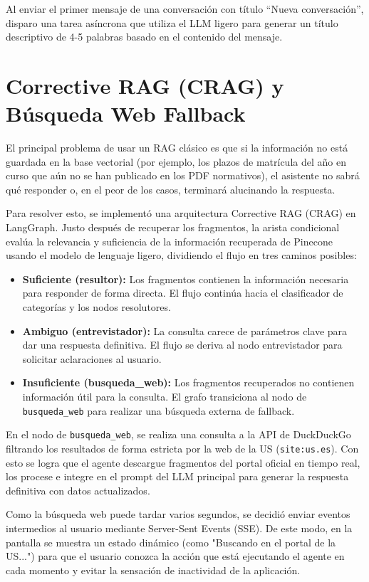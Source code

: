 \documentclass[12pt,a4paper,oneside]{report}
\begin{document}
Al enviar el primer mensaje de una conversación con título ``Nueva conversación'', disparo una tarea asíncrona que utiliza el LLM ligero para generar un título descriptivo de 4-5 palabras basado en el contenido del mensaje.

\section{Corrective RAG (CRAG) y Búsqueda Web Fallback}

El principal problema de usar un RAG clásico es que si la información no está guardada en la base vectorial (por ejemplo, los plazos de matrícula del año en curso que aún no se han publicado en los PDF normativos), el asistente no sabrá qué responder o, en el peor de los casos, terminará alucinando la respuesta.

Para resolver esto, se implementó una arquitectura Corrective RAG (CRAG) en LangGraph. Justo después de recuperar los fragmentos, la arista condicional evalúa la relevancia y suficiencia de la información recuperada de Pinecone usando el modelo de lenguaje ligero, dividiendo el flujo en tres caminos posibles:
\begin{itemize}
    \item \textbf{Suficiente (resultor):} Los fragmentos contienen la información necesaria para responder de forma directa. El flujo continúa hacia el clasificador de categorías y los nodos resolutores.
    \item \textbf{Ambiguo (entrevistador):} La consulta carece de parámetros clave para dar una respuesta definitiva. El flujo se deriva al nodo entrevistador para solicitar aclaraciones al usuario.
    \item \textbf{Insuficiente (busqueda\_web):} Los fragmentos recuperados no contienen información útil para la consulta. El grafo transiciona al nodo de \texttt{busqueda\_web} para realizar una búsqueda externa de fallback.
\end{itemize}

En el nodo de \texttt{busqueda\_web}, se realiza una consulta a la API de DuckDuckGo filtrando los resultados de forma estricta por la web de la US (\texttt{site:us.es}). Con esto se logra que el agente descargue fragmentos del portal oficial en tiempo real, los procese e integre en el prompt del LLM principal para generar la respuesta definitiva con datos actualizados.

Como la búsqueda web puede tardar varios segundos, se decidió enviar eventos intermedios al usuario mediante Server-Sent Events (SSE). De este modo, en la pantalla se muestra un estado dinámico (como "Buscando en el portal de la US...") para que el usuario conozca la acción que está ejecutando el agente en cada momento y evitar la sensación de inactividad de la aplicación.
\end{document}
